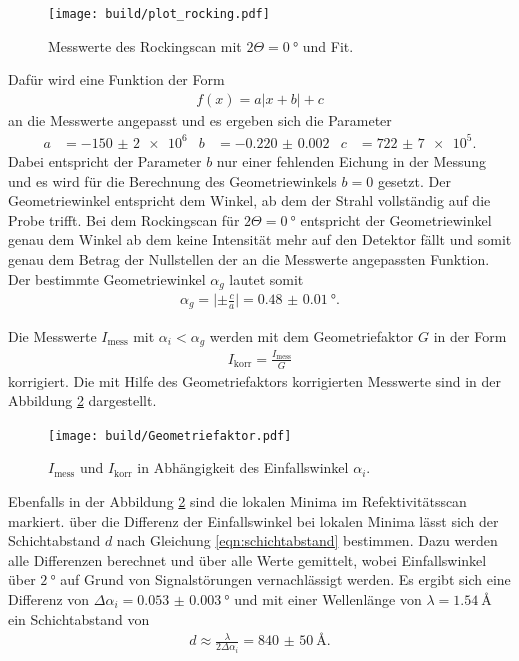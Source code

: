 \begin{figure}
  \centering
  \texttt{[image: build/plot\_rocking.pdf]}
  \caption{Messwerte des Rockingscan mit $2\Theta = \SI{0}{\degree}$ und Fit.}
  \label{fig:rock_scan_0}
\end{figure}

Dafür wird eine Funktion der Form
\begin{align}
  f(x) = a \lvert x + b \rvert + c
\end{align}
an die Messwerte angepasst und es ergeben sich die Parameter
\begin{align}
  a&=-\num{150(2)e6}  &b&=\num{-0.220(2)}  &c&=\num{722(7)e5}.
\end{align}
Dabei entspricht der Parameter $b$ nur einer fehlenden Eichung in der Messung und
es wird für die Berechnung des Geometriewinkels $b=0$ gesetzt.
Der Geometriewinkel entspricht dem Winkel, ab dem der Strahl
vollständig auf die Probe trifft. Bei dem Rockingscan für $2\Theta=\SI{0}{\degree}$
entspricht der Geometriewinkel genau dem Winkel ab dem keine Intensität
mehr auf den Detektor fällt und somit genau dem Betrag der Nullstellen der an die Messwerte
angepassten Funktion.
Der bestimmte Geometriewinkel $\alpha_g$
lautet somit
\begin{align}
\alpha_g = \lvert \pm\frac{c}{a} \rvert = \SI{0.48(1)}{\degree}.
\end{align}


Die Messwerte $I_{\mathrm{mess}}$ mit $\alpha_i < \alpha_g $ werden mit dem Geometriefaktor $G$
in der Form
\begin{align}
  I_{\mathrm{korr}} = \frac{I_{\mathrm{mess}}}{G}
\end{align}
korrigiert. Die mit Hilfe des Geometriefaktors korrigierten Messwerte sind in der Abbildung \ref{fig:korr} dargestellt.
\begin{figure}
  \centering
  \texttt{[image: build/Geometriefaktor.pdf]}
  \caption{$I_{\mathrm{mess}}$ und $I_{\mathrm{korr}}$ in Abhängigkeit des Einfallswinkel $\alpha_i$.}
  \label{fig:korr}
\end{figure}

Ebenfalls in der Abbildung \ref{fig:korr}
sind die lokalen Minima im Refektivitätsscan markiert.
über die Differenz der Einfallswinkel bei lokalen Minima lässt
sich der Schichtabstand $d$ nach Gleichung \eqref{eqn:schichtabstand}
bestimmen.
Dazu werden alle Differenzen
berechnet und über alle Werte gemittelt, wobei Einfallswinkel
über $\SI{2}{\degree}$ auf Grund von Signalstörungen vernachlässigt werden.
Es ergibt sich eine Differenz von $\Delta \alpha_i = \SI{0.053(3)}{\degree}$
und mit einer Wellenlänge von $\lambda=\SI{1.54}{\angstrom}$
ein Schichtabstand von
\begin{align}
d \approx \frac{\lambda}{2\Delta\alpha_i} = \SI{840(50)}{\angstrom}.
\end{align}

